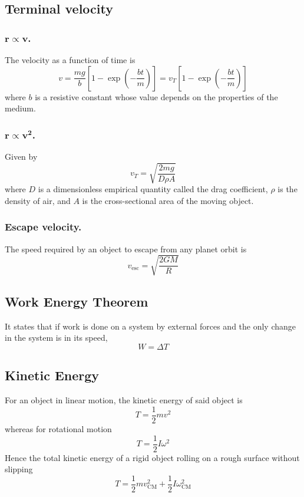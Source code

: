 \documentclass[../../../main.tex]{subfiles}
\begin{document}
\subsection{Terminal velocity}
\subsubsection{$\boldsymbol{r\propto v}$.} The velocity as a function of time is 
\begin{equation*}
    v=\frac{mg}{b}\left[1-\exp\left(-\frac{bt}{m}\right)\right]=v_T\left[1-\exp\left(-\frac{bt}{m}\right)\right]
\end{equation*}
where $b$ is a resistive constant whose value depends on the properties of the medium.
\subsubsection{$\boldsymbol{r\propto v^2}$.} Given by 
\begin{equation*}
    v_T=\sqrt{\frac{2mg}{D\rho A}}
\end{equation*}
where $D$ is a dimensionless empirical quantity called the drag coefficient, $\rho$ is the density of air, and $A$ is the cross-sectional area of the moving object.

\subsubsection{Escape velocity.} The speed required by an object to escape from any planet orbit is 
\begin{equation*}
    v_\text{esc}=\sqrt{\frac{2GM}{R}}
\end{equation*}

\subsection{Work Energy Theorem}
It states that if work is done on a system by external forces and
the only change in the system is in its speed,
\begin{equation*}
    W=\Delta T
\end{equation*}

\subsection{Kinetic Energy}
For an object in linear motion, the kinetic energy of said object is 
\begin{equation*}
    T=\frac{1}{2}mv^2
\end{equation*}
whereas for rotational motion
\begin{equation*}
    T=\frac{1}{2}I\omega^2
\end{equation*}
Hence the total kinetic energy of a rigid object rolling on a rough surface without slipping
\begin{equation*}
    T=\frac{1}{2}mv_\text{CM}^2+\frac{1}{2}I\omega_\text{CM}^2
\end{equation*}
\end{document}
